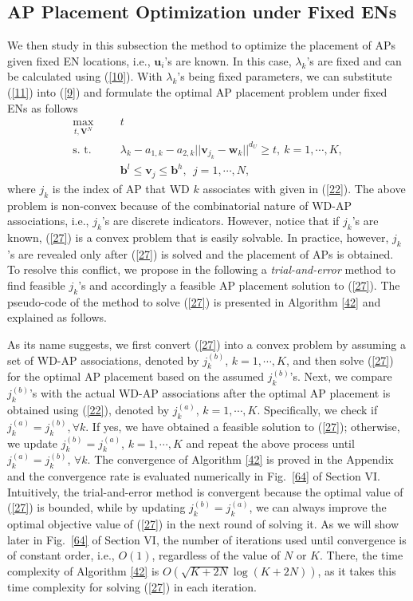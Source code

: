 \documentclass[journal, draftcls, one column, 12pt]{IEEEtran}
\begin{document}
\subsection{AP Placement Optimization under Fixed ENs}
We then study in this subsection the method to optimize the placement of APs given fixed EN locations, i.e., $\mathbf{u}_i$'s are known. In this case, $\lambda_k$'s are fixed and can be calculated using (\ref{10}). With $\lambda_k$'s being fixed parameters, we can substitute (\ref{11}) into (\ref{9}) and formulate the optimal AP placement problem under fixed ENs as follows
\begin{equation}
\label{27}
   \begin{aligned}
    \underset{t,\mathbf{V}^N}{\text{max}}&    & & t \\
    \text{s. t.}&  & &\lambda_k - a_{1,k} - a_{2,k} ||\mathbf{v}_{j_k} - \mathbf{w}_k||^{d_U} \geq  t, \ k=1,\cdots,K,  \\
    &                   & &\mathbf{b}^l\leq \mathbf{v}_{j}\leq \mathbf{b}^h,\ \ j=1,\cdots,N,
   \end{aligned}
\end{equation}
where $j_k$ is the index of AP that WD $k$ associates with given in (\ref{22}). The above problem is non-convex because of the combinatorial nature of WD-AP associations, i.e., $j_k$'s are discrete indicators. However, notice that if $j_k$'s are known, (\ref{27}) is a convex problem that is easily solvable. In practice, however, $j_k$'s are revealed only after (\ref{27}) is solved and the placement of APs is obtained. To resolve this conflict, we propose in the following a \emph{trial-and-error} method to find feasible $j_k$'s and accordingly a feasible AP placement solution to (\ref{27}). The pseudo-code of the method to solve (\ref{27}) is presented in Algorithm \ref{42} and explained as follows.

As its name suggests, we first convert (\ref{27}) into a convex problem by assuming a set of WD-AP associations, denoted by $j_k^{(b)}$, $k=1,\cdots,K$, and then solve (\ref{27}) for the optimal AP placement based on the assumed $j_k^{(b)}$'s. Next, we compare $j_k^{(b)}$'s with the actual WD-AP associations after the optimal AP placement is obtained using (\ref{22}), denoted by  $j_k^{(a)}$, $k=1,\cdots,K$. Specifically, we check if $j_k^{(a)} = j_k^{(b)},\forall k$. If yes, we have obtained a feasible solution to (\ref{27}); otherwise, we update $j_k^{(b)} = j_k^{(a)}$, $k=1,\cdots,K$ and repeat the above process until $j_k^{(a)} = j_k^{(b)}$, $\forall k$. The convergence of Algorithm \ref{42} is proved in the Appendix and the convergence rate is evaluated numerically in Fig.~\ref{64} of Section VI. Intuitively, the trial-and-error method is convergent because the optimal value of (\ref{27}) is bounded, while by updating $j_k^{(b)} = j_k^{(a)}$, we can always improve the optimal objective value of (\ref{27}) in the next round of solving it. As we will show later in Fig.~\ref{64} of Section VI, the number of iterations used until convergence is of constant order, i.e., $O(1)$, regardless of the value of $N$ or $K$. There, the time complexity of Algorithm \ref{42} is $O\left(\sqrt{K+2N}\log \left(K+2N\right)\right)$, as it takes this time complexity for solving (\ref{27}) in each iteration.
\end{document}
